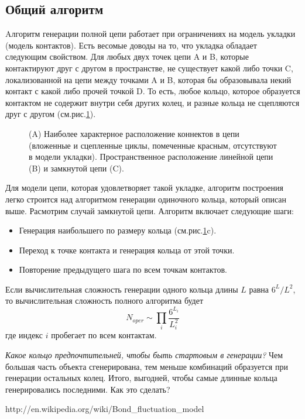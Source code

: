 \documentclass[tikz,a4paper]{scrartcl} %
\begin{document}
\subsection*{Общий алгоритм}
Aлгоритм генерации полной цепи работает при ограничениях на модель укладки (модель контактов). Есть весомые доводы на то, что укладка обладает следующим свойством. Для любых двух точек цепи A и B, которые контактируют друг с другом в пространстве, не существует какой либо точки C, локализованной на цепи между точками A и B, которая бы образовывала некий контакт с какой либо прочей точкой D. То есть, любое кольцо, которое образуется контактом не содержит внутри себя других колец, и разные кольца не сцепляются друг с другом (см.рис.\ref{pic:connects}).

\begin{figure}[h]
\caption{(A) Наиболее характерное расположение коннектов в цепи (вложенные и сцепленные циклы, помеченные красным, отсутствуют в модели укладки). Пространственное расположение линейной цепи (B) и замкнутой цепи (C).}
\label{pic:connects}
\end{figure}

Для модели цепи, которая удовлетворяет такой укладке, алгоритм построения легко строится над алгоритмом генерации одиночного кольца, который описан выше. Расмотрим случай замкнутой цепи. Алгоритм включает следующие шаги:
\begin{itemize}
\item Генерация наибольшего по размеру кольца (см.рис.\ref{pic:connects}c).
\item Переход к точке контакта и генерация кольца от этой точки.
\item Повторение предыдущего шага по всем точкам контактов.
\end{itemize}
Если вычислительная сложность генерации одного кольца длины $L$ равна $6^L/L^2$, то вычислительная сложность полного алгоритма будет 
\[ N_{oper} \sim \prod_i \frac{6^{L_i}}{L_i^2} \]
где индекс $i$ пробегает по всем контактам.

\textit{Какое кольцо предпочтительней, чтобы быть стартовым в генерации?} Чем большая часть объекта сгенерирована, тем меньше комбинаций образуется при генерации остальных колец. Итого, выгодней, чтобы самые длинные кольца генерировались последними. Как это сделать?

\begin{thebibliography}{99}
 http://en.wikipedia.org/wiki/Bond\_fluctuation\_model
\end{thebibliography}
\end{document}
